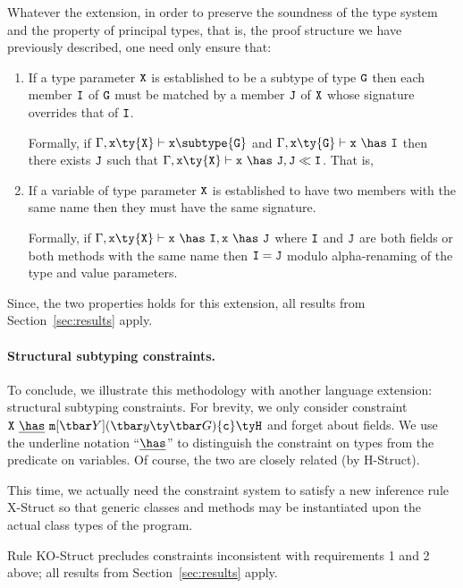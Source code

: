 Whatever the extension, in order to preserve the soundness of the type system and the property of principal types, that is, the proof structure we have previously described, one need only ensure that:
\begin{enumerate}
\item If a type parameter $\tt X$ is established to be a subtype of type $\tt G$ then each member $\tt I$ of $\tt G$ must be matched by a member $\tt J$ of $\tt X$ whose signature overrides that of $\tt I$.

Formally, if $\Gamma,{\tt x}\ty{\tt X}\vdash{\tt x}\subtype{\tt G}$ and $\Gamma,{\tt x}\ty{\tt G}\vdash{\tt x}~\has~{\tt I}$ then there exists $\tt J$ such that $\Gamma,{\tt x}\ty{\tt X}\vdash{\tt x}~\has~{\tt J}, {\tt J} \ll {\tt I}$. That is,

\item If a variable of type parameter $\tt X$ is established to have two members with the same name then they must have the same signature.

Formally, if $\Gamma,{\tt x}\ty{\tt X}\vdash{\tt x}~\has~{\tt I},{\tt x}~\has~{\tt J}$ where $\tt I$ and $\tt J$ are both fields or both methods with the same name then ${\tt I}={\tt J}$ modulo alpha-renaming of the type and value parameters.
\end{enumerate}

Since, the two properties holds for this extension, all results from Section~\ref{sec:results} apply.


\paragraph{Structural subtyping constraints.}
To conclude, we illustrate this methodology with another language extension: structural subtyping constraints. For brevity, we only consider constraint ${\tt X}~\underline{\has}~\msign{Y}{y}{G}{c}{H}$ and forget about fields. We use the underline notation ``$\underline{\has}$'' to distinguish the constraint on types from the predicate on variables. Of course, the two are closely related (by {\sc H-Struct}).

This time, we actually need the constraint system to satisfy a new inference rule {\sc X-Struct} so that generic classes and methods may be instantiated upon the actual class types of the program.

Rule {\sc KO-Struct} precludes constraints inconsistent with requirements 1 and 2 above; all results from Section~\ref{sec:results} apply.

